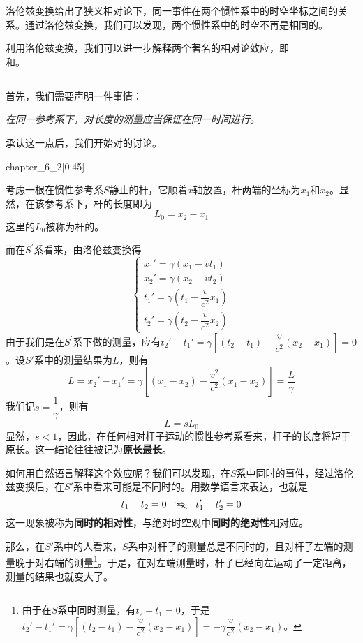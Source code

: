 洛伦兹变换给出了狭义相对论下，同一事件在两个惯性系中的时空坐标之间的关系。通过洛伦兹变换，我们可以发现，两个惯性系中的时空不再是相同的。

利用洛伦兹变换，我们可以进一步解释两个著名的相对论效应，即\\和。
\subsection[尺缩效应]{}
首先，我们需要声明一件事情：
\begin{center}
	\em 在同一参考系下，对长度的测量应当保证在同一时间进行。
\end{center}
承认这一点后，我们开始对的讨论。
\begin{singlefigure}{chapter_6_2}[0.45]
\end{singlefigure}
考虑一根在惯性参考系$S$静止的杆，它顺着$x$轴放置，杆两端的坐标为$x_1$和$x_2$。显然，在该参考系下，杆的长度即为$ $
\[L_0=x_2-x_1\]
这里的$L_0$被称为杆的。

而在$S^{\prime}$系看来，由洛伦兹变换得
\[\left\{\begin{array}{l}
	x_{1}'=\gamma(x_1-vt_1)\\
	x_{2}'=\gamma(x_2-vt_2)\\
	t_1'=\gamma(t_1-\dfrac{v}{c^2} x_1)\\[1ex]
	t_2'=\gamma(t_2-\dfrac{v}{c^2} x_2)
\end{array}\right.\]
由于我们是在$S^{\prime}$系下做的测量，应有$t_2'-t_1'=\gamma[(t_2-t_1)-\dfrac{v}{c^2} (x_2-x_1)]=0$。设$S'$系中的测量结果为$L$，则有
\[L=x_2'-x_1'=\gamma[(x_1-x_2)-\dfrac{v^2}{c^2}(x_1-x_2)]=\dfrac{L}{\gamma}\]
我们记$s=\dfrac{1}{\gamma}$，则有
\begin{equation}
	L=sL_0
\end{equation}
显然，$s<1$，因此，在任何相对杆子运动的惯性参考系看来，杆子的长度将短于原长。这一结论往往被记为\textbf{原长最长}。

如何用自然语言解释这个效应呢？我们可以发现，在$S$系中同时的事件，经过洛伦兹变换后，在$S'$系中看来可能是不同时的。用数学语言来表达，也就是
\[
	t_1-t_2=0\quad \bcancel{\Rightarrow}\quad t_1'-t_2'=0
\]
这一现象被称为\textbf{同时的相对性}，与绝对时空观中\textbf{同时的绝对性}相对应。

那么，在$S'$系中的人看来，$S$系中对杆子的测量总是不同时的，且对杆子左端的测量晚于对右端的测量\footnote{由于在$S$系中同时测量，有$t_2-t_1=0$，于是$t_2'-t_1'=\gamma[(t_2-t_1)-\dfrac{v}{c^2} (x_2-x_1)]=-\gamma \dfrac{v}{c^2} (x_2-x_1)$。}。于是，在对左端测量时，杆子已经向左运动了一定距离，测量的结果也就变大了。

